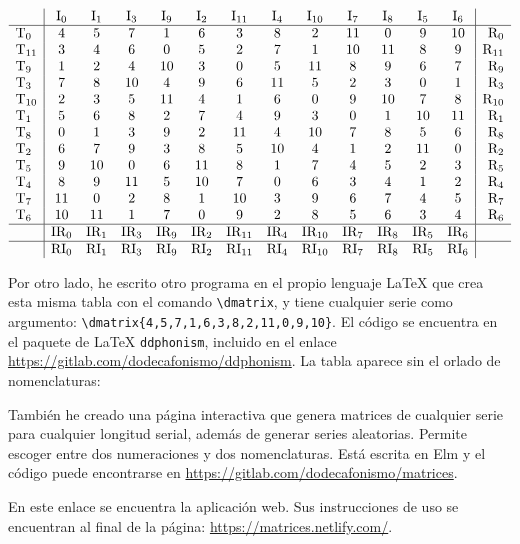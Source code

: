 		{$\begin{array}{l|cccccccccccc|r}
		&\mbox{I}_{0}&\mbox{I}_{1}&\mbox{I}_{3}&\mbox{I}_{9}&\mbox{I}_{2}&\mbox{I}_{11}&\mbox{I}_{4}&\mbox{I}_{10}&\mbox{I}_{7}&\mbox{I}_{8}&\mbox{I}_{5}&\mbox{I}_{6}&\\
		\hline
		\mbox{T}_{0}&4&5&7&1&6&3&8&2&11&0&9&10&\mbox{R}_{0}\\
		\mbox{T}_{11}&3&4&6&0&5&2&7&1&10&11&8&9&\mbox{R}_{11}\\
		\mbox{T}_{9}&1&2&4&10&3&0&5&11&8&9&6&7&\mbox{R}_{9}\\
		\mbox{T}_{3}&7&8&10&4&9&6&11&5&2&3&0&1&\mbox{R}_{3}\\
		\mbox{T}_{10}&2&3&5&11&4&1&6&0&9&10&7&8&\mbox{R}_{10}\\
		\mbox{T}_{1}&5&6&8&2&7&4&9&3&0&1&10&11&\mbox{R}_{1}\\
		\mbox{T}_{8}&0&1&3&9&2&11&4&10&7&8&5&6&\mbox{R}_{8}\\
		\mbox{T}_{2}&6&7&9&3&8&5&10&4&1&2&11&0&\mbox{R}_{2}\\
		\mbox{T}_{5}&9&10&0&6&11&8&1&7&4&5&2&3&\mbox{R}_{5}\\
		\mbox{T}_{4}&8&9&11&5&10&7&0&6&3&4&1&2&\mbox{R}_{4}\\
		\mbox{T}_{7}&11&0&2&8&1&10&3&9&6&7&4&5&\mbox{R}_{7}\\
		\mbox{T}_{6}&10&11&1&7&0&9&2&8&5&6&3&4&\mbox{R}_{6}\\
		\hline
		&\mbox{IR}_{0}&\mbox{IR}_{1}&\mbox{IR}_{3}&\mbox{IR}_{9}&\mbox{IR}_{2}&\mbox{IR}_{11}&\mbox{IR}_{4}&\mbox{IR}_{10}&\mbox{IR}_{7}&\mbox{IR}_{8}&\mbox{IR}_{5}&\mbox{IR}_{6}&\\
		\hline
		&\mbox{RI}_{0}&\mbox{RI}_{1}&\mbox{RI}_{3}&\mbox{RI}_{9}&\mbox{RI}_{2}&\mbox{RI}_{11}&\mbox{RI}_{4}&\mbox{RI}_{10}&\mbox{RI}_{7}&\mbox{RI}_{8}&\mbox{RI}_{5}&\mbox{RI}_{6}&
		\end{array}$}
	
		Por otro lado, he escrito otro programa en el propio lenguaje \LaTeX{} que crea esta misma tabla con el comando \verb|\dmatrix|, y tiene cualquier serie como argumento: \verb|\dmatrix{4,5,7,1,6,3,8,2,11,0,9,10}|. %
		El c\'odigo se encuentra en el paquete de \LaTeX{} \texttt{ddphonism}, incluido en el enlace  \url{https://gitlab.com/dodecafonismo/ddphonism}.
		La tabla aparece sin el orlado de nomenclaturas:
		
		Tambi\'en he creado una p\'agina interactiva que genera matrices de cualquier serie para cualquier longitud serial, adem\'as de generar series aleatorias. Permite escoger entre dos numeraciones y dos nomenclaturas. Est\'a escrita en Elm y el c\'odigo puede encontrarse en \url{https://gitlab.com/dodecafonismo/matrices}.
		
			
			En este enlace se encuentra la aplicaci\'on web. Sus instrucciones de uso se encuentran al final de la p\'agina: \url{https://matrices.netlify.com/}.